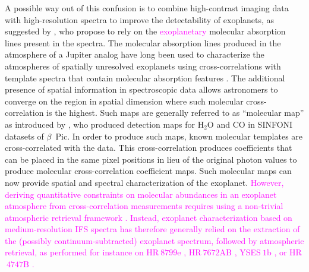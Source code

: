 \documentclass[referee]{aa} %
\newcommand{\newchange}[1]{\textcolor{magenta}{#1}}
\begin{document}
A possible way out of this confusion is %
to combine high-contrast imaging data with high-resolution spectra to improve the detectability of exoplanets, as suggested by \citet{2015Snellen}, who propose to rely on the \newchange{exoplanetary} molecular absorption lines present in the spectra.
The molecular absorption lines produced in the atmosphere of a Jupiter analog have long been used to characterize the atmospheres of spatially unresolved exoplanets using cross-correlations with template spectra \cite[e.g.,][]{snellen2010orbital,birkby2013detection} that contain molecular absorption features \citep[e.g.,][]{2003BTsettl}.
The additional presence of spatial information in spectroscopic data allows astronomers to converge on the region in spatial dimension where such molecular cross-correlation is the highest.
Such maps are generally referred to as ``molecular map'' as introduced by \citet{2018AHoeijmakersMM}, who produced detection maps for \rm{H$_2$O} and \rm{CO} in SINFONI datasets of $\beta$~Pic.
In order to produce such maps, known molecular templates are cross-correlated with the data.
This cross-correlation produces coefficients that can be placed in the same pixel positions in lieu of the original photon values to produce molecular cross-correlation coefficient maps.
Such molecular maps can now provide spatial and spectral characterization of the exoplanet.
\newchange{However, deriving quantitative constraints on molecular abundances in an exoplanet atmosphere from cross-correlation measurements requires using a non-trivial atmospheric retrieval framework \citep{Brogi2019}. Instead, exoplanet characterization based on medium-resolution IFS spectra has therefore generally relied on the extraction of the (possibly continuum-subtracted) exoplanet spectrum, followed by atmospheric retrieval, as performed for instance on HR$~8799$e \citep[][]{2020MolliereHR8799e}, HR$~7672$AB \citep[][]{2022WangHR7672AB}, YSES$~1$b \citep[][]{2022Zhang}, or HR$~4747$B \citep[][]{2022Xuan4747B}.}
\end{document}
